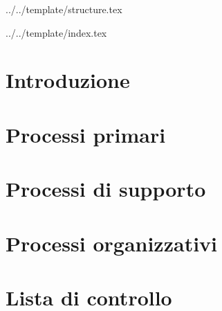 


\def\DOCUMENTO{Norme di Progetto}
\def\VERSIONE{3.0.0}

\def\DESCRIZIONE{Documento contenente l'insieme di norme stabilite dal gruppo \GRUPPO per la realizzazione del progetto didattico \PROGETTO.}

\def\REDATTORE {Suierica Bogdan \\ & Agostinetto Matteo}
\def\VERIFICATORE {Burlin Valerio}
\def\RESPONSABILE {Carraro Nicola}

\def\USO {Interno}

\def\DISTRIBUZIONE {\GRUPPO{}\\ & \COMMITTENTE{}\\}

\def\DESCRIZIONE {Documento contenente l'insieme di norme stabilite dal gruppo \GRUPPO\ per la realizzazione di \PROGETTO.}


\def\INDICE	{true}
\def\TABELLE {false}
\def\FIGURE {true}


 {../../template/structure.tex}



 {../../template/index.tex}


\section{Introduzione}


\newpage
\section{Processi primari}


\newpage
\section{Processi di supporto}


\newpage
\section{Processi organizzativi}



\newpage
\appendix
\section{Lista di controllo}







